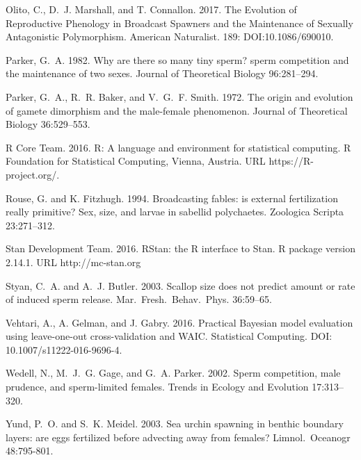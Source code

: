 \documentclass{article}
\begin{document}
\begin{thebibliography}{}
Olito, C., D.~J. Marshall, and T. Connallon. 2017.
\newblock The Evolution of Reproductive Phenology in Broadcast Spawners and the Maintenance of Sexually Antagonistic Polymorphism.
\newblock American Naturalist. 189: DOI:10.1086/690010.

Parker, G.~A. 1982.
\newblock Why are there so many tiny sperm? sperm competition and the maintenance of two sexes.
\newblock Journal of Theoretical Biology 96:281--294.

Parker, G.~A., R.~R. Baker, and V.~G.~F. Smith. 1972.
\newblock The origin and evolution of gamete dimorphism and the male-female phenomenon.
\newblock Journal of Theoretical Biology 36:529--553.

R Core Team. 2016.
\newblock R: A language and environment for statistical computing. 
\newblock R Foundation for Statistical Computing, Vienna, Austria. URL https://R-project.org/.

Rouse, G. and K. Fitzhugh. 1994.
\newblock Broadcasting fables: is external fertilization really primitive? Sex, size, and larvae in sabellid polychaetes.
\newblock Zoologica Scripta 23:271--312.

Stan Development Team. 2016.
\newblock RStan: the R interface to Stan.
\newblock R package version 2.14.1. URL http://mc-stan.org

Styan, C.~A. and A.~J. Butler. 2003.
\newblock Scallop size does not predict amount or rate of induced sperm release.
\newblock Mar.~Fresh.~Behav.~Phys. 36:59--65.

Vehtari, A., A. Gelman, and J. Gabry. 2016.
\newblock Practical Bayesian model evaluation using leave-one-out cross-validation and WAIC.
\newblock Statistical Computing. DOI: 10.1007/s11222-016-9696-4.

Wedell, N., M.~J.~G. Gage, and G.~A. Parker. 2002.
\newblock Sperm competition, male prudence, and sperm-limited females.
\newblock Trends in Ecology and Evolution 17:313--320.

Yund, P.~O. and S.~K. Meidel. 2003.
\newblock Sea urchin spawning in benthic boundary layers: are eggs fertilized before advecting away from females?
\newblock Limnol.~Oceanogr 48:795-801.

\end{thebibliography}

\newpage{}
\end{document}
